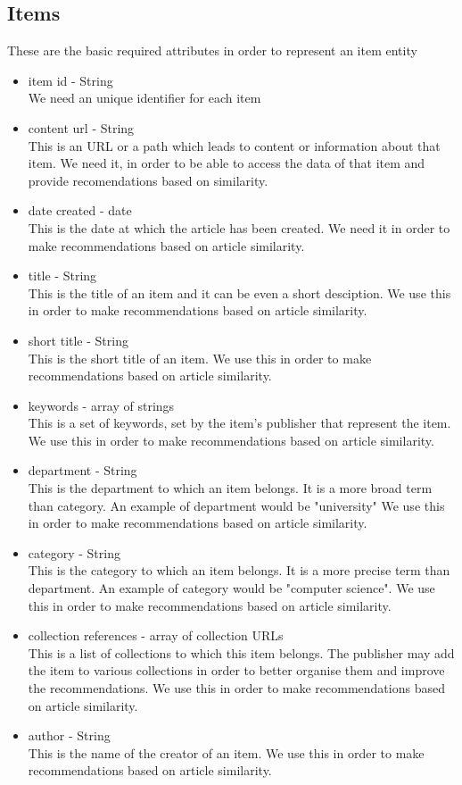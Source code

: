 \subsection{Items}
\label{sec:items}
These are the basic required attributes in order to represent an item entity
\begin{itemize}
	\item item id - String
		\\ We need an unique identifier for each item
	\item content url - String
		\\ This is an URL or a path which leads to content or information about that item.
		We need it, in order to be able to access the data of that item and provide recomendations based on similarity. 
	\item date created - date
		\\ This is the date at which the article has been created.
		We need it in order to make recommendations based on article similarity.
	\item title - String
		\\ This is the title of an item and it can be even a short desciption.
		We use this in order to make recommendations based on article similarity.
	\item short title - String
		\\ This is the short title of an item.
		We use this in order to make recommendations based on article similarity.
	\item keywords - array of strings
		\\ This is a set of keywords, set by the item's publisher that represent the item.
		We use this in order to make recommendations based on article similarity.
	\item department - String
		\\ This is the department to which an  item belongs. It is a more broad term than category. An example of department would be "university"
		We use this in order to make recommendations based on article similarity.
	\item category - String
		\\ This is the category to which an item belongs. It is a more precise term than department. An example of category would be "computer science".
		We use this in order to make recommendations based on article similarity.
	\item collection references - array of collection URLs
		\\ This is a list of collections to which this item belongs. The publisher may add the item to various collections in order to better organise them and improve the recommendations.
		We use this in order to make recommendations based on article similarity.
	\item author - String
		\\ This is the name of the creator of an item.
		We use this in order to make recommendations based on article similarity.
\end{itemize}

